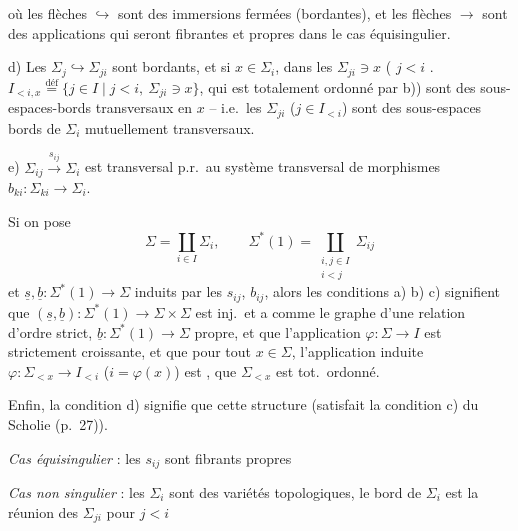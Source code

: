 \documentclass[11pt,a4paper]{article}
\begin{document}
où les flèches $\hookrightarrow$ sont des  immersions fermées (bordantes), et les flèches $\longrightarrow$ sont des applications qui seront fibrantes et propres dans le cas équisingulier.


d) Les $\Sigma_{j}\hookrightarrow\Sigma_{ji}$ sont bordants, et si $x\in\Sigma_i$,  dans les $\Sigma_{ji}\ni x$ (  $j<i$ . $I_{<i,x}\overset{\text{déf}}{=}\lbrace j\in I\mid j<i,\ \Sigma_{ji}\ni x\rbrace$, qui est totalement ordonné par b)) sont des sous-espaces-bords transversaux en $x$ -- i.e.\ les $\Sigma_{ji}$ ($j\in I_{<i}$) sont des sous-espaces bords de $\Sigma_i$ mutuellement transversaux.

e) $\Sigma_{ij}\xrightarrow{s_{ij}}\Sigma_i$ est transversal p.r.\ au système transversal de morphismes  $b_{ki} : \Sigma_{ki}\to\Sigma_i$.

Si on pose
\[
\Sigma=\coprod_{i\in I}\Sigma_i,\qquad \Sigma^{*}(1)=\coprod_{\substack{i,j\in I\\ i<j}}\Sigma_{ij}
\]
et $\underline s,\underline b : \Sigma^{*}(1)\to\Sigma$ induits par les $s_{ij}$, $b_{ij}$, alors les conditions a) b) c) signifient que $(\underline s,\underline b) : \Sigma^{*}(1)\to\Sigma\times\Sigma$ est inj.\ et a comme   le graphe d'une relation d'ordre strict, $\underline b : \Sigma^{*}(1)\to\Sigma$  propre, et que l'application \add{\ill{}} $\varphi : \Sigma\to I$ est strictement croissante, et que pour tout $x\in\Sigma$, l'application induite $\varphi : \Sigma_{<x}\to I_{<i}$ ($i=\varphi(x)$) est , \ill{} que $\Sigma_{<x}$ est tot.\ ordonné.


Enfin, la condition d) signifie que cette structure  (satisfait la condition c) du Scholie (p.~27)).

\emph{Cas équisingulier} : les $s_{ij}$ sont fibrants propres

\emph{Cas non singulier} : les $\Sigma_i$ sont des variétés topologiques, le bord de $\Sigma_i$ est la réunion des $\Sigma_{ji}$ pour $j<i$  \struck{\ill{}}
\end{document}
